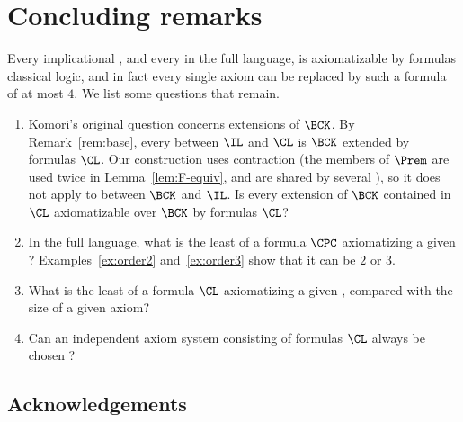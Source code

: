 \section{Concluding remarks}\label{sec:conclusion}

Every implicational , and every  in the full language, is axiomatizable by formulas 
classical logic, and in fact every single axiom can be replaced by such a
formula of  at most $4$. We list some questions that remain.

\begin{enumerate}
\item Komori's original question concerns extensions of $\BCK$. By
  Remark~\ref{rem:base}, every  between $\IL$ and $\CL$ is $\BCK$
  extended by formulas  $\CL$. Our construction uses
  contraction (the members of $\Prem$ are used twice in
  Lemma~\ref{lem:F-equiv}, and  are shared by several
  ), so it does not apply to  between $\BCK$
  and $\IL$. Is every extension of $\BCK$ contained in $\CL$ axiomatizable
  over $\BCK$ by formulas  $\CL$?
\item In the full language, what is the least  of a formula
   $\CPC$ axiomatizing a given ?
  Examples~\ref{ex:order2} and~\ref{ex:order3} show that it can be $2$ or
  $3$.
\item What is the least  of a formula  $\CL$
  axiomatizing a given , compared with the size of a given
  axiom?
\item Can an independent axiom system consisting of formulas  $\CL$ always be chosen \cite[Open Problem~3]{NM21}?
\end{enumerate}

\subsection*{Acknowledgements}
